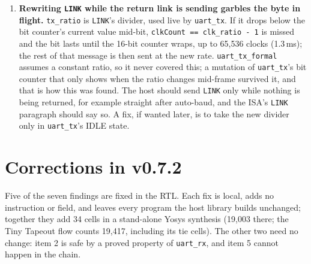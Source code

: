 \documentclass[11pt,a4paper]{article}
\newcommand{\sig}[1]{\texttt{#1}}
\begin{document}
\begin{enumerate}
\item \textbf{Rewriting \sig{LINK} while the return link is sending garbles the byte in flight.} \sig{tx\_ratio} is \sig{LINK}'s divider, used live by \sig{uart\_tx}. If it drops below the bit counter's current value mid-bit, \sig{clkCount == clk\_ratio - 1} is missed and the bit lasts until the 16-bit counter wraps, up to 65,536 clocks (1.3\,ms); the rest of that message is then sent at the new rate. \sig{uart\_tx\_formal} assumes a constant ratio, so it never covered this; a mutation of \sig{uart\_tx}'s bit counter that only shows when the ratio changes mid-frame survived it, and that is how this was found. The host should send \sig{LINK} only while nothing is being returned, for example straight after auto-baud, and the ISA's \sig{LINK} paragraph should say so. A fix, if wanted later, is to take the new divider only in \sig{uart\_tx}'s IDLE state.
\end{enumerate}

\section{Corrections in v0.7.2}\label{sec:fixes}

Five of the seven findings are fixed in the RTL. Each fix is local, adds no instruction or field, and leaves every program the host library builds unchanged; together they add 34 cells in a stand-alone Yosys synthesis (19,003 there; the Tiny Tapeout flow counts 19,417, including its tie cells). The other two need no change: item 2 is safe by a proved property of \sig{uart\_rx}, and item 5 cannot happen in the chain.
\end{document}
